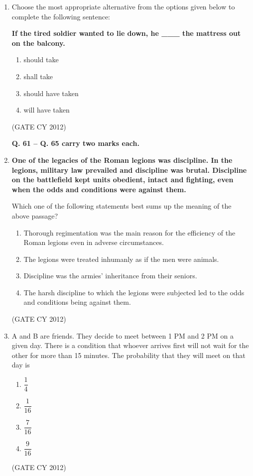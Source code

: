 \documentclass[12pt]{article}
\begin{document}
\begin{enumerate}
\item Choose the most appropriate alternative from the options given below to complete the following sentence:

\textbf{If the tired soldier wanted to lie down, he \_\_\_ the mattress out on the balcony.}

\begin{multicols}{2}
\begin{enumerate}
    \item should take
    \item shall take
    \item should have taken
    \item will have taken
\end{enumerate}
\end{multicols}
\hfill (GATE CY 2012)

\textbf{Q. 61 -- Q. 65 carry two marks each.}


\item \textbf{One of the legacies of the Roman legions was discipline. In the legions, military law prevailed and discipline was brutal. Discipline on the battlefield kept units obedient, intact and fighting, even when the odds and conditions were against them.}

Which one of the following statements best sums up the meaning of the above passage?

\begin{enumerate}
    \item Thorough regimentation was the main reason for the efficiency of the Roman legions even in adverse circumstances.
    \item The legions were treated inhumanly as if the men were animals.
    \item Discipline was the armies’ inheritance from their seniors.
    \item The harsh discipline to which the legions were subjected led to the odds and conditions being against them.
\end{enumerate}
\hfill (GATE CY 2012)

    \item A and B are friends. They decide to meet between 1 PM and 2 PM on a given day. There is a condition that whoever arrives first will not wait for the other for more than 15 minutes. The probability that they will meet on that day is
    \begin{multicols}{2}
        \begin{enumerate}[label=(\Alph*)]
            \item $\dfrac{1}{4}$
            \item $\dfrac{1}{16}$
            \item $\dfrac{7}{16}$
            \item $\dfrac{9}{16}$
        \end{enumerate}
    \end{multicols}
    \hfill (GATE CY 2012)


\end{enumerate}
\end{document}
